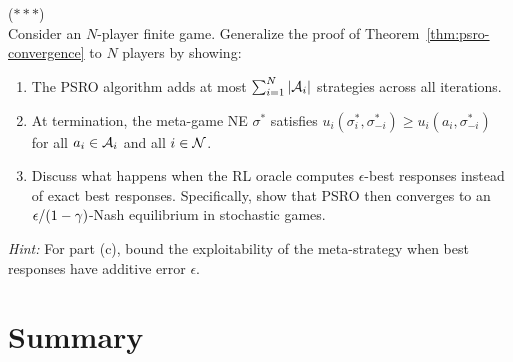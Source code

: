 \documentclass[11pt,a4paper]{article}
\begin{document}
\begin{exercise}
\textnormal{(\(***\))} \\
Consider an $N$-player finite game.  Generalize the proof of
Theorem~\ref{thm:psro-convergence} to $N$ players by showing:
\begin{enumerate}[label=(\alph*)]
  \item The PSRO algorithm adds at most $\sum_{i=1}^N |\mathcal{A}_i|$
    strategies across all iterations.
  \item At termination, the meta-game NE $\sigma^*$ satisfies
    $u_i(\sigma_i^*, \sigma_{-i}^*) \ge u_i(a_i, \sigma_{-i}^*)$ for
    all $a_i \in \mathcal{A}_i$ and all $i \in \mathcal{N}$.
  \item Discuss what happens when the RL oracle computes
    $\epsilon$-best responses instead of exact best responses.
    Specifically, show that PSRO then converges to an
    $\epsilon/(1-\gamma)$-Nash equilibrium in stochastic games.
\end{enumerate}
\textit{Hint:} For part (c), bound the exploitability of the
meta-strategy when best responses have additive error $\epsilon$.
\end{exercise}


\section{Summary}
\end{document}

